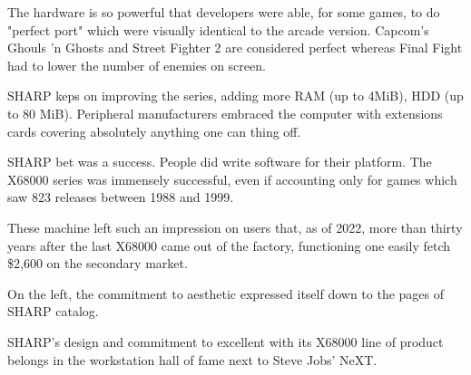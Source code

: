 The hardware is so powerful that developers were able, for some games, to do "perfect port" which were visually identical to the arcade version. Capcom's Ghouls 'n Ghosts and Street Fighter 2 are considered perfect whereas Final Fight had to lower the number of enemies on screen.

 SHARP keps on improving the series, adding more RAM (up to 4MiB), HDD (up to 80 MiB). Peripheral manufacturers embraced the computer with extensions cards covering absolutely anything one can thing off. 

 SHARP bet was a success. People did write software for their platform. The X68000 series was immensely successful, even if accounting only for games which saw 823 releases between 1988 and 1999.


These machine left such an impression on users that, as of 2022, more than thirty years after the last X68000 came out of the factory, functioning one easily fetch \$2,600 on the secondary market.


On the left, the commitment to aesthetic expressed itself down to the pages of SHARP catalog. 

SHARP's design and commitment to excellent with its X68000 line of product belongs in the workstation hall of fame next to Steve Jobs' NeXT.